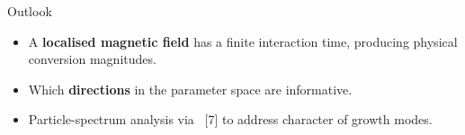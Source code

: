 \begin{block}{Outlook}
  \begin{itemize}
    \item A \textbf{localised magnetic field} has a finite interaction time, producing
          physical conversion magnitudes.
    \item Which \textbf{directions} in the parameter space are informative.
    \item Particle-spectrum analysis via \textbf{\PSALTer{}}~[7] to address character of
          growth modes.
  \end{itemize}

\end{block}
